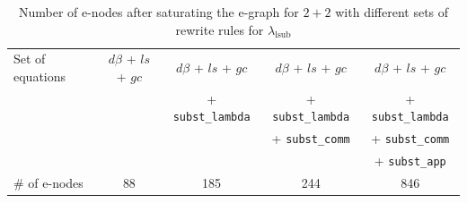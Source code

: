 
\begin{table}
	\begin{tabular}{lcccc}
		Set of equations & $d\beta$ + $ls$ + $gc$ & $d\beta$ + $ls$ + $gc$    & $d\beta$ + $ls$ + $gc$     & $d\beta$ + $ls$ + $gc$\\
		                 &                        & + \texttt{subst\_lambda}  & + \texttt{subst\_lambda}   & + \texttt{subst\_lambda}\\
		                 &                        &                           & + \texttt{subst\_comm}     & + \texttt{subst\_comm}\\
						 &                        &                           &                            & + \texttt{subst\_app}\\						 
		\# of e-nodes    & 88                     & 185                       & 244                        & 846
	\end{tabular}
	\caption{Number of e-nodes after saturating the e-graph for $2 + 2$ with different sets of rewrite rules for $\lambda_{\text{lsub}}$}
	\label{tbl:slotted}
\end{table}

